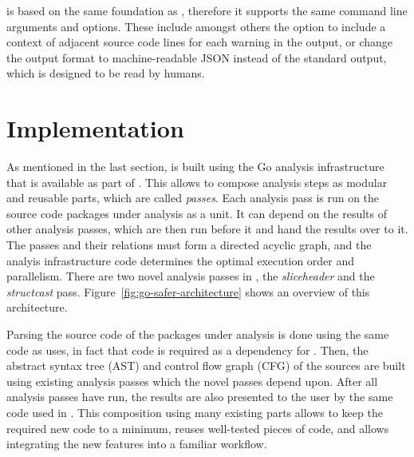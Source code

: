 

\toolSafer{} is based on the same foundation as \toolVet{}, therefore it supports the same command line arguments and
options.
These include amongst others the option to include a context of adjacent source code lines for each warning in the
output, or change the output format to machine-readable JSON instead of the standard output, which is designed to be
read by humans.



\section{Implementation}\label{sec:go-safer:implementation}

As mentioned in the last section, \toolSafer{} is built using the Go analysis infrastructure that is available as part
of \toolVet{}.
This allows to compose analysis steps as modular and reusable parts, which are called \textit{passes}.
Each analysis pass is run on the source code packages under analysis as a unit.
It can depend on the results of other analysis passes, which are then run before it and hand the results over to it.
The passes and their relations must form a directed acyclic graph, and the analyis infrastructure code determines the
optimal execution order and parallelism.
There are two novel analysis passes in \toolSafer{}, the \textit{sliceheader} and the \textit{structcast} pass.
Figure~\ref{fig:go-safer-architecture} shows an overview of this architecture.



Parsing the source code of the packages under analysis is done using the same code as \toolVet{} uses, in fact that code
is required as a dependency for \toolSafer{}.
Then, the abstract syntax tree (\acrshort{AST}) and control flow graph (\acrshort{CFG}) of the sources are built using
existing analysis passes which the novel \toolSafer{} passes depend upon.
After all analysis passes have run, the results are also presented to the user by the same code used in \toolVet{}.
This composition using many existing parts allows to keep the required new code to a minimum, reuses well-tested pieces
of code, and allows integrating the new \toolSafer{} features into a familiar workflow.

